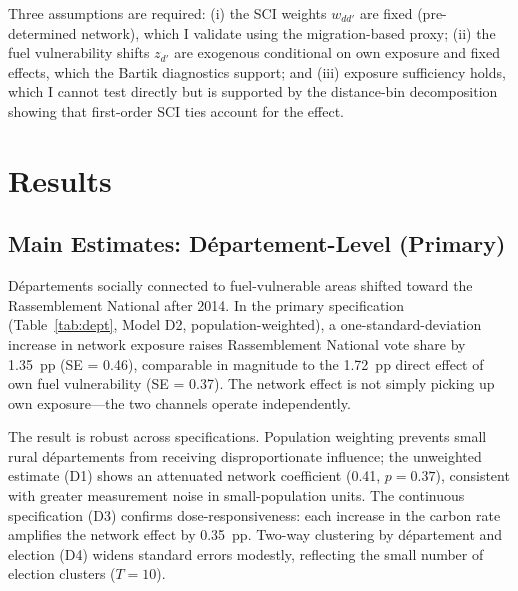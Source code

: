 \documentclass[12pt]{article}
\providecommand{\euro}{\texteuro}
\newcommand{\rn}{Rassemblement National}
\newcommand{\dept}{d\'{e}partement}
\newcommand{\depts}{d\'{e}partements}
\begin{document}
Three assumptions are required: (i) the SCI weights $w_{dd'}$ are fixed (pre-determined network), which I validate using the migration-based proxy; (ii) the fuel vulnerability shifts $z_{d'}$ are exogenous conditional on own exposure and fixed effects, which the Bartik diagnostics support; and (iii) exposure sufficiency holds, which I cannot test directly but is supported by the distance-bin decomposition showing that first-order SCI ties account for the effect.



\section{Results}
\label{sec:results}

\subsection{Main Estimates: D\'{e}partement-Level (Primary)}

D\'{e}partements socially connected to fuel-vulnerable areas shifted toward the \rn{} after 2014. In the primary specification (Table~\ref{tab:dept}, Model D2, population-weighted), a one-standard-deviation increase in network exposure raises \rn{} vote share by 1.35~pp (SE = 0.46), comparable in magnitude to the 1.72~pp direct effect of own fuel vulnerability (SE = 0.37). The network effect is not simply picking up own exposure---the two channels operate independently.

The result is robust across specifications. Population weighting prevents small rural \depts{} from receiving disproportionate influence; the unweighted estimate (D1) shows an attenuated network coefficient (0.41, $p = 0.37$), consistent with greater measurement noise in small-population units. The continuous specification (D3) confirms dose-responsiveness: each \euro 10 increase in the carbon rate amplifies the network effect by 0.35~pp. Two-way clustering by \dept{} and election (D4) widens standard errors modestly, reflecting the small number of election clusters ($T = 10$).
\end{document}
